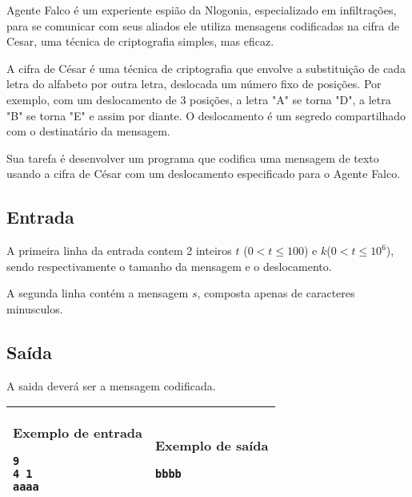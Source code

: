 Agente Falco é um experiente espião da Nlogonia, especializado em infiltrações, para se comunicar com seus aliados ele utiliza mensagens codificadas na cifra de Cesar, uma técnica de criptografia simples, mas eficaz.

A cifra de César é uma técnica de criptografia que envolve a substituição de cada letra do alfabeto por outra letra, deslocada um número fixo de posições. Por exemplo, com um deslocamento de 3 posições, a letra "A" se torna "D", a letra "B" se torna "E" e assim por diante. O deslocamento é um segredo compartilhado com o destinatário da mensagem.

Sua tarefa é desenvolver um programa que codifica uma mensagem de texto usando a cifra de César com um deslocamento especificado para o Agente Falco.
\subsection*{Entrada}
 
A primeira linha da entrada  contem 2 inteiros $t$ ($0 < t \leq 100$) e $k$($0 < t \leq 10^6$), sendo respectivamente o tamanho da mensagem e o deslocamento.
 
A segunda linha contém a mensagem $s$, composta apenas de caracteres minusculos.
 
\subsection*{Saída}
A saida deverá ser a mensagem codificada.

\begin{table}[!h]
\centering
\begin{tabular}{|l|l|}
\hline
\begin{minipage}[t]{3in}
\textbf{Exemplo de entrada}
\begin{verbatim}
9
4 1
aaaa
\end{verbatim}
\vspace{1mm}
\end{minipage}
&
\begin{minipage}[t]{3in}
\textbf{Exemplo de saída}
\begin{verbatim}
bbbb
\end{verbatim}
\vspace{1mm}
\end{minipage} \\
\hline
\end{tabular}
\end{table}

